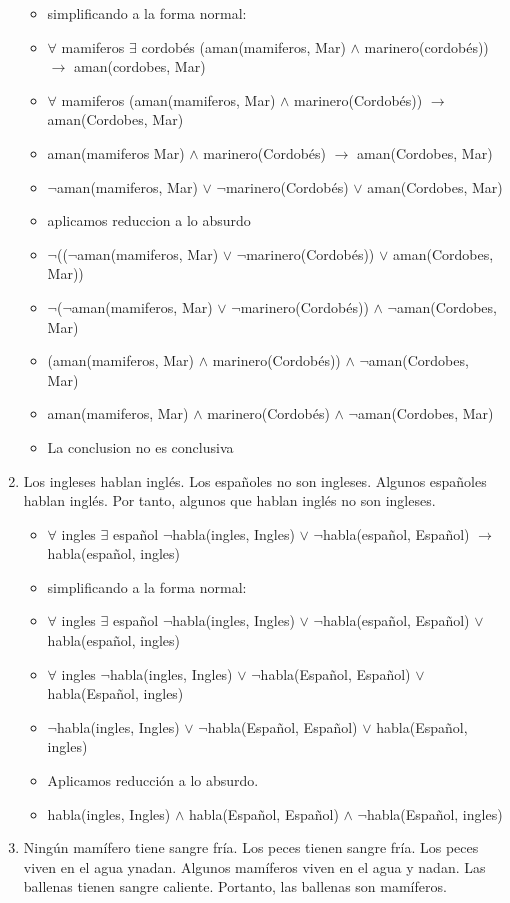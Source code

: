 \documentclass[a4paper,10pt]{article}
\begin{document}
\begin{enumerate}
\begin{itemize}
		\item simplificando a la forma normal:
		\item $\forall$ mamiferos $\exists$ cordobés (aman(mamiferos, Mar) $\land$ marinero(cordobés)) $\rightarrow$ aman(cordobes, Mar)
		\item $\forall$ mamiferos (aman(mamiferos, Mar) $\land$ marinero(Cordobés)) $\rightarrow$ aman(Cordobes, Mar)
		\item aman(mamiferos Mar) $\land$ marinero(Cordobés) $\rightarrow$ aman(Cordobes, Mar)
		\item $\lnot$aman(mamiferos, Mar) $\lor$ $\lnot$marinero(Cordobés) $\lor$ aman(Cordobes, Mar)
		\item aplicamos reduccion a lo absurdo
		\item $\lnot$(($\lnot$aman(mamiferos, Mar) $\lor$ $\lnot$marinero(Cordobés)) $\lor$ aman(Cordobes, Mar))
		\item $\lnot$($\lnot$aman(mamiferos, Mar) $\lor$ $\lnot$marinero(Cordobés)) $\land$ $\lnot$aman(Cordobes, Mar)
		\item (aman(mamiferos, Mar) $\land$ marinero(Cordobés)) $\land$ $\lnot$aman(Cordobes, Mar)
		\item aman(mamiferos, Mar) $\land$ marinero(Cordobés) $\land$ $\lnot$aman(Cordobes, Mar)
		\item La conclusion no es conclusiva
	\end{itemize}
	\item Los ingleses hablan inglés. Los españoles no son ingleses. Algunos españoles hablan inglés. Por tanto, algunos que hablan inglés no son ingleses.
	\begin{itemize}
		\item $\forall$ ingles $\exists$ español $\lnot$habla(ingles, Ingles) $\lor$ $\lnot$habla(español, Español) $\rightarrow$ habla(español, ingles)
		\item simplificando a la forma normal:
		\item $\forall$ ingles $\exists$ español $\lnot$habla(ingles, Ingles) $\lor$ $\lnot$habla(español, Español) $\lor$ habla(español, ingles)
		\item $\forall$ ingles $\lnot$habla(ingles, Ingles) $\lor$ $\lnot$habla(Español, Español) $\lor$ habla(Español, ingles)
		\item $\lnot$habla(ingles, Ingles) $\lor$ $\lnot$habla(Español, Español) $\lor$ habla(Español, ingles)
		\item Aplicamos reducción a lo absurdo.
		\item habla(ingles, Ingles) $\land$ habla(Español, Español) $\land$ $\lnot$habla(Español, ingles)
	\end{itemize}
	\item Ningún mamífero tiene sangre fría. Los peces tienen sangre fría. Los peces viven en el agua ynadan. Algunos mamíferos viven en el agua y nadan. Las ballenas tienen sangre caliente. Portanto, las ballenas son mamíferos.


\end{enumerate}
\end{document}
